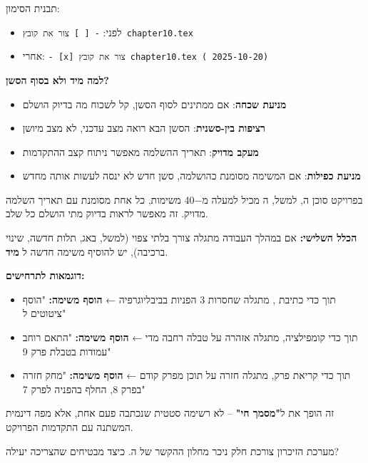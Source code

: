 תבנית הסימון:
\begin{itemize}
  \item לפני: \texttt{- [ ] צור את קובץ chapter10.tex}
  \item אחרי: \texttt{- [x] צור את קובץ chapter10.tex (\checkmark{} 2025-10-20)}
\end{itemize}

\textbf{למה מיד ולא בסוף הסשן?}
\begin{itemize}
  \item \textbf{מניעת שכחה}: אם ממתינים לסוף הסשן, קל לשכוח מה בדיוק הושלם
  \item \textbf{רציפות בין-סשנית}: הסשן הבא רואה מצב עדכני, לא מצב מיושן
  \item \textbf{מעקב מדויק}: תאריך ההשלמה מאפשר ניתוח קצב ההתקדמות
  \item \textbf{מניעת כפילות}: אם המשימה מסומנת כהושלמה, סשן חדש לא ינסה לעשות אותה מחדש
\end{itemize}

בפרויקט סוכן ה, למשל, ה מכיל למעלה מ\num{-40} משימות, כל אחת מסומנת עם תאריך השלמה מדויק. זה מאפשר לראות בדיוק מתי הושלם כל שלב.


\textbf{הכלל השלישי:} אם במהלך העבודה מתגלה צורך בלתי צפוי (למשל, באג, תלות חדשה, שינוי ברכיבה), יש להוסיף משימה חדשה ל \textbf{מיד}.

\textbf{דוגמאות לתרחישים:}
\begin{itemize}
  \item תוך כדי כתיבת , מתגלה שחסרות \num{3} הפניות בביבליוגרפיה ← \textbf{הוסף משימה:} "הוסף ציטוטים  ל"
  \item תוך כדי קומפילציה, מתגלה אזהרה על טבלה רחבה מדי ← \textbf{הוסף משימה:} "התאם רוחב עמודות בטבלת פרק \num{9}"
  \item תוך כדי קריאת פרק, מתגלה חזרה על תוכן מפרק קודם ← \textbf{הוסף משימה:} "מחק חזרה בפרק \num{8}, החלף בהפניה לפרק \num{7}"
\end{itemize}

זה הופך את  ל\textbf{"מסמך חי"} – לא רשימה סטטית שנכתבה פעם אחת, אלא מפה דינמית המשתנה עם התקדמות הפרויקט.


מערכת הזיכרון צורכת חלק ניכר מחלון ההקשר של ה. כיצד מבטיחים שהצריכה יעילה?

